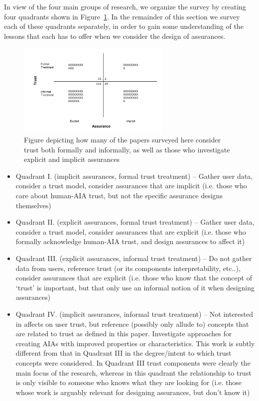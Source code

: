 In view of the four main groups of research, we organize the survey by creating four quadrants shown in Figure~\ref{fig:trust_assurance_intention}. In the remainder of this section we survey each of these quadrants separately, in order to gain some understanding of the lessons that each has to offer when we consider the design of assurances.

\begin{figure}[htbp]
    \centering
    \includegraphics[width=0.65\textwidth]{Figures/Trust_vs_Assurance_Intention.pdf}
    \caption{Figure depicting how many of the papers surveyed here consider trust both formally and informally, as well as those who investigate explicit and implicit assurances}
    \label{fig:trust_assurance_intention}
\end{figure}

\begin{itemize}
    \item Quadrant I. (implicit assurances, formal trust treatment) -- Gather user data, consider a trust model, consider assurances that are implicit (i.e. those who care about human-AIA trust, but not the specific assurance designs themselves)
    \item Quadrant II. (explicit assurances, formal trust treatment) -- Gather user data, consider a trust model, consider assurances that are explicit (i.e. those who formally acknowledge human-AIA trust, and design assurances to affect it)
    \item Quadrant III. (explicit assurances, informal trust treatment) -- Do not gather data from users, reference trust (or its components interpretability, etc..), consider assurances that are explicit (i.e. those who know that the concept of `trust' is important, but that only use an informal notion of it when designing assurances)
    \item Quadrant IV. (implicit assurances, informal trust treatment) -- Not interested in affects on user trust, but reference (possibly only allude to) concepts that are related to trust as defined in this paper. Investigate approaches for creating AIAs with improved properties or characteristics. This work is subtly different from that in Quadrant III in the degree/intent to which trust concepts were considered. In Quadrant III trust components were clearly the main focus of the research, whereas in this quadrant the relationship to trust is only visible to someone who knows what they are looking for (i.e. those whose work is arguably relevant for designing assurances, but don't know it)
\end{itemize}





